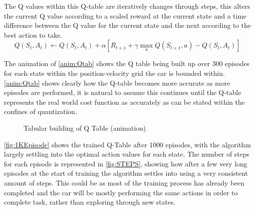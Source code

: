 \documentclass[sigconf]{acmart}
\begin{document}
The Q values within this Q-table are iteratively changes through steps, this alters the current Q value according to a scaled reward at the current state and a time difference between the Q value for the current state and the next according to the best action to take.
\begin{equation} \label{eqn:Qtab}
  Q(S_t, A_t) \leftarrow Q(S_t, A_t) + \alpha [R_{t+1} + \gamma \max_a Q(S_{t+1}, a) - Q(S_t, A_t)]
\end{equation}

The animation of \autoref{anim:Qtab} shows the Q table being built up over 300 episodes for each state within the position-velocity grid the car is bounded within. 
\autoref{anim:Qtab} shows clearly how the Q-table becomes more accurate as more episodes are performed, it is natural to assume this continues until the Q-table represents the real world cost function as accurately as can be stated within the confines of quantization.
\begin{figure}[h]
  \centering
  \caption{Tabular building of Q Table (animation)}
  \label{anim:Qtab}
\end{figure}

\autoref{fig:1KEpisode} shows the trained Q-Table after 1000 episodes, with the algorithm largely settling into the optimal action values for each state. 
The number of steps for each episode is represented in \autoref{fig:STEPS}, showing how after a few very long episodes at the start of training the algorithm settles into using a very consistent amount of steps.
This could be as most of the training process has already been completed and the car will be mostly performing the same actions in order to complete task, rather than exploring through new states.
\end{document}

